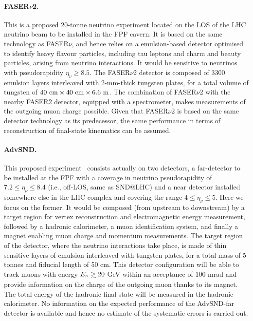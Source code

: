 \paragraph{FASER$\nu$2.}
%
This is a proposed 20-tonne neutrino experiment located on the LOS
of the LHC neutrino beam to be installed in the FPF cavern.
%
It is based on the same technology as FASER$\nu$, and hence
relies on a emulsion-based detector optimised to identify heavy flavour particles, including
tau leptons and charm and beauty particles, arising from neutrino interactions.
%
It would be sensitive to neutrinos with pseudorapidity $\eta_\nu \ge 8.5$.
%
The FASER$\nu$2 detector is composed of 3300 emulsion layers interleaved with 2-mm-thick tungsten plates,
for a total volume of  tungsten of $40~\rm{cm} \times 40~\rm{cm} \times 6.6~{\rm m}$.
%
The combination of FASER$\nu$2  with the nearby FASER2 detector, equipped with a spectrometer, makes measurements of the outgoing muon charge possible.
%
Given that FASER$\nu$2 is based on the same detector technology
as its predecessor, the same performance in terms of reconstruction
of final-state kinematics can be assumed.

 \paragraph{AdvSND.}
 This proposed experiment~\cite{Feng:2022inv} consists actually on  two detectors, a far-detector to be installed
 at the FPF with a coverage in neutrino pseudorapidity of $7.2 \le \eta_\nu \le 8.4$
 (i.e., off-LOS, same as SND@LHC) and a near detector installed somewhere else in the LHC
 complex and covering the range $4 \le \eta_\nu \le 5$.
Here we focus on the former.
 It would be
 composed (from upstream to downstream) by a target region
 for  vertex reconstruction and electromagnetic energy measurement, followed  by a hadronic calorimeter, a  muon 
 identification system, and finally  a magnet enabling muon charge and momentum measurements.
 The target region of the detector, where the neutrino interactions take place, is made of thin sensitive layers of emulsion interleaved with tungsten plates, for a total mass of 5 tonnes and fiducial length of 50 cm.
 This detector configuration will be able to track muons with energy $E_\nu \gsim 20$ GeV
 within an acceptance of 100 mrad and provide information on the charge
 of the  outgoing muon thanks to its magnet.
 The total energy of the hadronic final state will be measured
 in the hadronic calorimeter.
 No information on the expected performance of the AdvSND-far detector
 is available and hence no estimate of the systematic errors
 is carried out.

